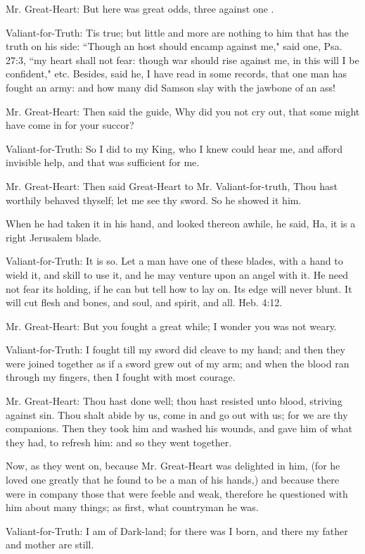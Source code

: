 Mr. Great-Heart: But here was great odds, three against one .

Valiant-for-Truth: Tis true; but little and more are nothing to him that has the truth on his side: ``Though an host should encamp against me," said one, Psa. 27:3, ``my heart shall not fear: though war should rise against me, in this will I be confident," etc. Besides, said he, I have read in some records, that one man has fought an army: and how many did Samson slay with the jawbone of an ass!

Mr. Great-Heart: Then said the guide, Why did you not cry out, that some might have come in for your succor?

Valiant-for-Truth: So I did to my King, who I knew could hear me, and afford invisible help, and that was sufficient for me.

Mr. Great-Heart: Then said Great-Heart to Mr. Valiant-for-truth, Thou hast worthily behaved thyself; let me see thy sword. So he showed it him.

When he had taken it in his hand, and looked thereon awhile, he said, Ha, it is a right Jerusalem blade.

Valiant-for-Truth: It is so. Let a man have one of these blades, with a hand to wield it, and skill to use it, and he may venture upon an angel with it. He need not fear its holding, if he can but tell how to lay on. Its edge will never blunt. It will cut flesh and bones, and soul, and spirit, and all. Heb. 4:12.

Mr. Great-Heart: But you fought a great while; I wonder you was not weary.

Valiant-for-Truth: I fought till my sword did cleave to my hand; and then they were joined together as if a sword grew out of my arm; and when the blood ran through my fingers, then I fought with most courage.

Mr. Great-Heart: Thou hast done well; thou hast resisted unto blood, striving against sin. Thou shalt abide by us, come in and go out with us; for we are thy companions. Then they took him and washed his wounds, and gave him of what they had, to refresh him: and so they went together.

Now, as they went on, because Mr. Great-Heart was delighted in him, (for he loved one greatly that he found to be a man of his hands,) and because there were in company those that were feeble and weak, therefore he questioned with him about many things; as first, what countryman he was.

Valiant-for-Truth: I am of Dark-land; for there was I born, and there my father and mother are still.

